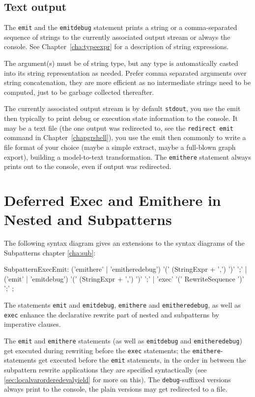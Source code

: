 \subsection*{Text output}
The \texttt{emit} and the \texttt{emitdebug} statement prints a string or a comma-separated sequence of strings to the currently associated output stream or always the console. See Chapter~\ref{cha:typeexpr} for a description of string expressions.

The argument(s) must be of string type, but any type is automatically casted into its string representation as needed. Prefer comma separated arguments over string concatenation, they are more efficient as no intermediate strings need to be computed, just to be garbage collected thereafter.

The currently associated output stream is by default \texttt{stdout}, you use the emit then typically to print debug or execution state information to the console.
It may be a text file (the one output was redirected to, see the \texttt{redirect emit} command in Chapter~\ref{chapgrshell}), you use the emit then commonly to write a file format of your choice (maybe a simple extract, maybe a full-blown graph export), building a model-to-text transformation.
The \texttt{emithere} statement always prints out to the console, even if output was redirected.

\section{Deferred Exec and Emithere in Nested and Subpatterns}\label{sec:deferredexecemithere}

The following syntax diagram gives an extensions to the syntax diagrams of the Subpatterns chapter \ref{cha:sub}:
\begin{rail}
  SubpatternExecEmit:
		('emithere' | 'emitheredebug') '(' (StringExpr + ',') ')' ';' |
		('emit' | 'emitdebug') '(' (StringExpr + ',') ')' ';' |
		'exec' '(' RewriteSequence ')' ';'
	;
\end{rail}

The statements \texttt{emit} and \texttt{emitdebug}, \texttt{emithere} and \texttt{emitheredebug}, as well as \texttt{exec} enhance the declarative rewrite part of nested and subpatterns by imperative clauses.

The \texttt{emit} and \texttt{emithere} statements (as well as \texttt{emitdebug} and \texttt{emitheredebug}) get executed during rewriting before the \texttt{exec} statements;
the \texttt{emithere}-statements get executed before the \texttt{emit} statements,
in the order in between the subpattern rewrite applications they are specified syntactically
(see \ref{sec:localvarorderedevalyield} for more on this).
The \texttt{debug}-suffixed versions always print to the console, the plain versions may get redirected to a file.

